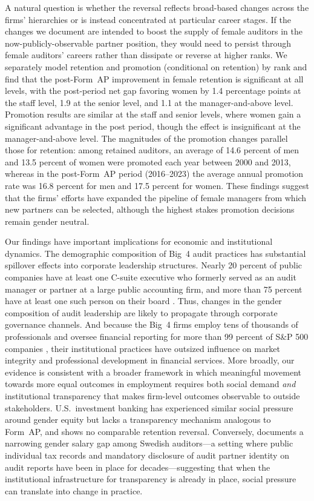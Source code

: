 \documentclass[11pt]{article}
\begin{document}
    A natural question is whether the reversal reflects broad-based changes across the firms' hierarchies or is instead concentrated at particular career stages. If the changes we document are intended to boost the supply of female auditors in the now-publicly-observable partner position, they would need to persist through female auditors' careers rather than dissipate or reverse at higher ranks. We separately model retention and promotion (conditional on retention) by rank and find that the post-Form~AP improvement in female retention is significant at all levels, with the post-period net gap favoring women by 1.4 percentage points at the staff level, 1.9 at the senior level, and 1.1 at the manager-and-above level. Promotion results are similar at the staff and senior levels, where women gain a significant advantage in the post period, though the effect is insignificant at the manager-and-above level. The magnitudes of the promotion changes parallel those for retention: among retained auditors, an average of 14.6 percent of men and 13.5 percent of women were promoted each year between 2000 and 2013, whereas in the post-Form~AP period (2016--2023) the average annual promotion rate was 16.8 percent for men and 17.5 percent for women. These findings suggest that the firms' efforts have expanded the pipeline of female managers from which new partners can be selected, although the highest stakes promotion decisions remain gender neutral.
    
    Our findings have important implications for economic and institutional dynamics. The demographic composition of Big~4 audit practices has substantial spillover effects into corporate leadership structures. Nearly 20 percent of public companies have at least one C-suite executive who formerly served as an audit manager or partner at a large public accounting firm, and more than 75 percent have at least one such person on their board \parencite{albrechtAuditorsRecognizePotential2018}. Thus, changes in the gender composition of audit leadership are likely to propagate through corporate governance channels. And because the Big~4 firms employ tens of thousands of professionals and oversee financial reporting for more than 99 percent of S\&P 500 companies \parencite{pakalukAuditorMarketShare2017}, their institutional practices have outsized influence on market integrity and professional development in financial services. More broadly, our evidence is consistent with a broader framework in which meaningful movement towards more equal outcomes in employment requires both social demand \textit{and} institutional transparency that makes firm-level outcomes observable to outside stakeholders. U.S.\ investment banking has experienced similar social pressure around gender equity but lacks a transparency mechanism analogous to Form~AP, and shows no comparable retention reversal. Conversely, \textcite{dongGenderSalaryGap2024} documents a narrowing gender salary gap among Swedish auditors---a setting where public individual tax records and mandatory disclosure of audit partner identity on audit reports have been in place for decades---suggesting that when the institutional infrastructure for transparency is already in place, social pressure can translate into change in practice. 
    
\end{document}

